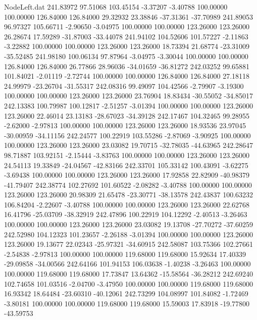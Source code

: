 \begin{filecontents}{NodeLeft.dat}
 241.83972   97.51068  103.45154    -3.37207   -3.40788  100.00000  100.00000  126.84000  126.84000   29.32932   23.38846  -37.31361  -37.70989
 241.89053   96.97327  105.66711    -2.90650   -3.04975  100.00000  100.00000  123.26000  123.26000   26.28674   17.59289  -31.87003  -33.44078
 241.94102  104.52606  101.57227    -2.11863   -3.22882  100.00000  100.00000  123.26000  123.26000   18.73394   21.68774  -23.31009  -35.52485
 241.98180  100.06134   97.87964    -3.04975   -3.30044  100.00000  100.00000  126.84000  126.84000   26.77866   28.96036  -34.01659  -36.81272
 242.03252   99.65881  101.84021    -2.01119   -2.72744  100.00000  100.00000  126.84000  126.84000   27.18118   24.99979  -23.26704  -31.55317
 242.08316   99.49097  104.42566    -2.79907   -3.19300  100.00000  100.00000  123.26000  123.26000   23.76904   18.83434  -30.55052  -34.85017
 242.13383  100.79987  100.12817    -2.51257   -3.01394  100.00000  100.00000  123.26000  123.26000   22.46014   23.13183  -28.67023  -34.39128
 242.17467  104.32465   99.28955    -2.62000   -2.97813  100.00000  100.00000  123.26000  123.26000   18.93536   23.97045  -30.00959  -34.11156
 242.24577  100.22919  103.55286    -2.87069   -3.90925  100.00000  100.00000  123.26000  123.26000   23.03082   19.70715  -32.78035  -44.63965
 242.28647   98.71887  103.92151    -2.15444   -3.83763  100.00000  100.00000  123.26000  123.26000   24.54113   19.33849  -24.04567  -42.83166
 242.33701  105.33142  100.43091    -3.62275   -3.69438  100.00000  100.00000  123.26000  123.26000   17.92858   22.82909  -40.98379  -41.79407
 242.38774  102.27692  101.60522    -2.08282   -3.40788  100.00000  100.00000  123.26000  123.26000   20.98309   21.65478  -23.30771  -38.13578
 242.43837  100.63232  106.84204    -2.22607   -3.40788  100.00000  100.00000  123.26000  123.26000   22.62768   16.41796  -25.03709  -38.32919
 242.47896  100.22919  104.12292    -2.40513   -3.26463  100.00000  100.00000  123.26000  123.26000   23.03082   19.13708  -27.70272  -37.60259
 242.52980  104.12323  101.23657    -2.26188   -3.01394  100.00000  100.00000  123.26000  123.26000   19.13677   22.02343  -25.97321  -34.60915
 242.58087  103.75366  102.27661    -2.54838   -2.97813  100.00000  100.00000  119.68000  119.68000   15.92634   17.40339  -29.09858  -34.00566
 242.64166  101.94153  106.03638    -1.40238   -3.26463  100.00000  100.00000  119.68000  119.68000   17.73847   13.64362  -15.58564  -36.28212
 242.69240  102.74658  101.03516    -2.04700   -3.47950  100.00000  100.00000  119.68000  119.68000   16.93342   18.64484  -23.60310  -40.12061
 242.73299  104.08997  101.84082    -1.72469   -3.80181  100.00000  100.00000  119.68000  119.68000   15.59003   17.83918  -19.77800  -43.59753

\end{filecontents}
